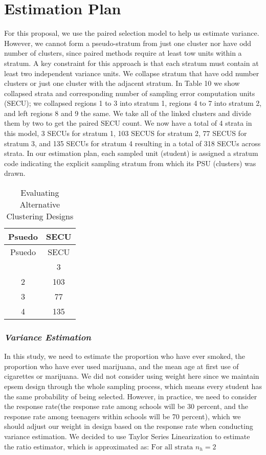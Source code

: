 \documentclass[
  12pt]{article}
\begin{document}
\section{Estimation Plan}\label{estimation-plan}

For this proposal, we use the paired selection model to help us estimate
variance. However, we cannot form a pseudo-stratum from just one cluster
nor have odd number of clusters, since paired methods require at least
tow units within a stratum. A key constraint for this approach is that
each stratum must contain at least two independent variance units. We
collapse stratum that have odd number clusters or just one cluster with
the adjacent stratum. In Table 10 we show collapsed strata and
corresponding number of sampling error computation units (SECU); we
collapsed regions 1 to 3 into stratum 1, regions 4 to 7 into stratum 2,
and left regions 8 and 9 the same. We take all of the linked clusters
and divide them by two to get the paired SECU count. We now have a total
of 4 strata in this model, 3 SECUs for stratum 1, 103 SECUS for stratum
2, 77 SECUS for stratum 3, and 135 SECUs for stratum 4 resulting in a
total of 318 SECUs across strata. In our estimation plan, each sampled
unit (student) is assigned a stratum code indicating the explicit
sampling stratum from which its PSU (clusters) was drawn.

\begin{longtable}[]{@{}cc@{}}
\caption{Evaluating Alternative Clustering Designs}\tabularnewline
\toprule\noalign{}
Psuedo & SECU \\
\midrule\noalign{}
\endfirsthead
\toprule\noalign{}
Psuedo & SECU \\
\midrule\noalign{}
\endhead
\bottomrule\noalign{}
\endlastfoot
1 & 3 \\
2 & 103 \\
3 & 77 \\
4 & 135 \\
\end{longtable}

\subsubsection{\texorpdfstring{\emph{Variance
Estimation}}{Variance Estimation}}\label{variance-estimation}

In this study, we need to estimate the proportion who have ever smoked,
the proportion who have ever used marijuana, and the mean age at first
use of cigarettes or marijuana. We did not consider using weight here
since we maintain epsem design through the whole sampling process, which
means every student has the same probability of being selected. However,
in practice, we need to consider the response rate(the response rate
among schools will be 30 percent, and the response rate among teenagers
within schools will be 70 percent), which we should adjust our weight in
design based on the response rate when conducting variance estimation.
We decided to use Taylor Series Linearization to estimate the ratio
estimator, which is approximated as: \(\text{For all strata } n_h = 2\)
\end{document}
